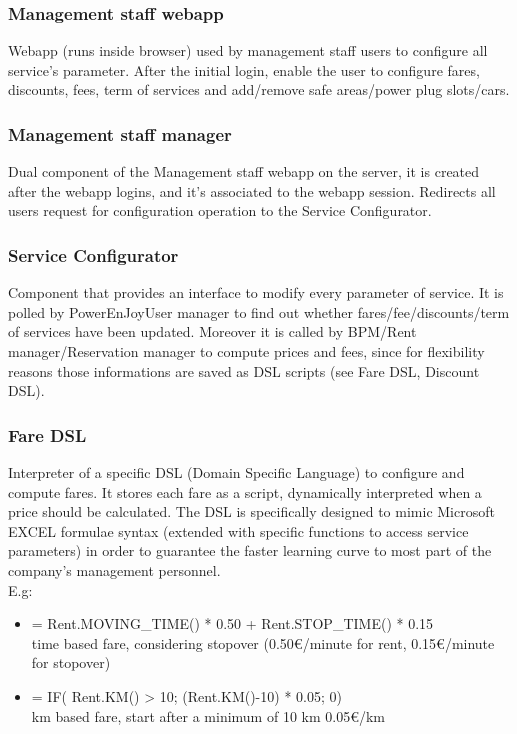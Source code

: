 \documentclass[english]{article}
\begin{document}
	\subsubsection{Management staff webapp}
	Webapp (runs inside browser) used by management staff users to configure all service's parameter. After the initial login, enable the user to configure fares, discounts, fees, term of services and add/remove safe areas/power plug slots/cars.
	\subsubsection{Management staff manager}
	Dual component of the Management staff webapp on the server, it is created after the webapp logins, and it's associated to the webapp session. Redirects all users request for configuration operation to the Service Configurator.
	\subsubsection{Service Configurator}
	Component that provides an interface to modify every parameter of service. It is polled by PowerEnJoyUser manager to find out whether fares/fee/discounts/term of services have been updated. Moreover it is called by BPM/Rent manager/Reservation manager to compute prices and fees, since for flexibility reasons those informations are saved as DSL scripts (see Fare DSL, Discount DSL).
		\subsubsection{Fare DSL}
		Interpreter of a specific DSL (Domain Specific Language) to configure and compute fares. It stores each fare as a script,  dynamically interpreted when a price should be calculated. The DSL is specifically designed to mimic Microsoft EXCEL formulae syntax (extended with specific functions to access service parameters) in order to guarantee the faster learning curve to most part of the company's management personnel.\\
		E.g: 
		\begin{itemize}
			\item { = Rent.MOVING\_TIME() * 0.50 + Rent.STOP\_TIME() * 0.15     \\time based fare, considering stopover (0.50\euro/minute for rent, 0.15\euro/minute for stopover)}
			\item { = IF( Rent.KM() > 10; (Rent.KM()-10) * 0.05; 0) 			      \\ km based fare, start after a minimum of 10 km 0.05\euro/km}
		\end{itemize}
\end{document}
